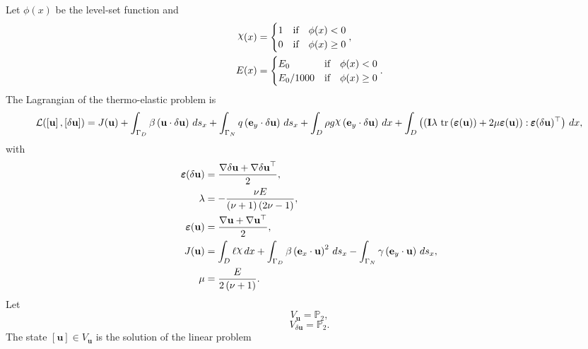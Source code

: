 \documentclass[preview]{standalone}
\let\oldcdot\cdot
\let\cdot\oldcdot
\begin{document}
Let $\phi(x)$ be the level-set function and
 \begin{align*}\raisebox{\depth}{$\chi$}(x) &= \begin{cases} 1 & \mbox{if}\quad \phi(x) < 0 \\ 0 & \mbox{if}\quad \phi(x)  \ge 0 \end{cases},\\
E(x) &= \begin{cases} E_0 & \mbox{if}\quad \phi(x) < 0 \\ E_0/1000 & \mbox{if}\quad \phi(x)  \ge 0 \end{cases}.\end{align*}
The Lagrangian of the thermo-elastic problem is
\begin{dmath*}
\mathcal L(\left[ {\mathbf{ u }}\right],\left[ {\delta\mathbf{  u }}\right]) = J({\mathbf{ u }}) +  \int_{\Gamma_D} \beta \left( {\mathbf{ u }} \cdot {\delta\mathbf{  u }} \right) \,ds_x +  \int_{\Gamma_N} q \left( \mathbf e_y \cdot {\delta\mathbf{  u }} \right) \,ds_x +  \int_{D} \rho g \raisebox{\depth}{$\chi$} \left( \mathbf e_y \cdot {\delta\mathbf{  u }} \right) \,dx +  \int_{D} \left( \left( \mathbf{I} \lambda  \,\operatorname{tr}\left(\bm\varepsilon({\mathbf{ u }})\right)  + 2 \mu \bm\varepsilon({\mathbf{ u }}) \right) \mathrel{:}  \pmb\varepsilon({\delta\mathbf{  u }})^\top  \right) \,dx , 
\end{dmath*}
with 
\begin{align*}
\pmb\varepsilon({\delta\mathbf{  u }}) &= \frac{ \nabla {\delta\mathbf{  u }}  +   \nabla {\delta\mathbf{  u }} ^\top }{2},\\
\lambda &= - \frac{\nu E}{\left(\nu + 1\right) \left(2 \nu - 1\right)},\\
\bm\varepsilon({\mathbf{ u }}) &= \frac{ \nabla {\mathbf{ u }}  +   \nabla {\mathbf{ u }} ^\top }{2},\\
J({\mathbf{ u }}) &=  \int_{D} \ell \raisebox{\depth}{$\chi$} \,dx +  \int_{\Gamma_D} \beta \left( \mathbf e_x \cdot {\mathbf{ u }} \right)^{2} \,ds_x -  \int_{\Gamma_N} \gamma \left( \mathbf e_y \cdot {\mathbf{ u }} \right) \,ds_x,\\
\mu &= \frac{E}{2 \left(\nu + 1\right)}.
 \end{align*}
Let
\begin{equation*}
V_{{\mathbf{ u }}} = \mathbb P_{2},\end{equation*}
\begin{equation*}
V_{{\delta\mathbf{  u }}} = \mathbb P_{2}.\end{equation*}
The state $\left[ {\mathbf{ u }}\right] \in  V_{{\mathbf{ u }}}$ is the solution of the linear problem
\end{document}
